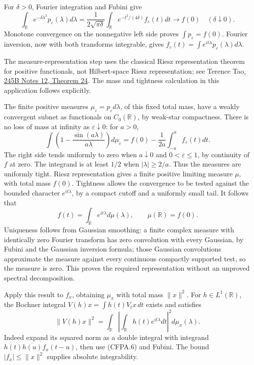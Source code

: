 For \(\delta>0\), Fourier integration and Fubini give \[
\int_{\mathbb R}e^{-\delta\lambda^2}p_\varepsilon(\lambda)d\lambda
=\frac1{2\sqrt{\pi\delta}}
\int_{\mathbb R}e^{-t^2/(4\delta)}f_\varepsilon(t)dt
\longrightarrow f(0)
\quad(\delta\downarrow0).
\tag{CFPA.4}
\] Monotone convergence on the nonnegative left side proves
\(\int p_\varepsilon=f(0)\). Fourier inversion, now with both transforms
integrable, gives
\(f_\varepsilon(t)=\int e^{it\lambda}p_\varepsilon(\lambda)d\lambda\).

The measure-representation step uses the classical Riesz representation theorem for positive functionals, not Hilbert-space Riesz representation; see Terence Tao, \href{https://terrytao.wordpress.com/2009/03/02/245b-notes-12-continuous-functions-on-locally-compact-hausdorff-spaces/}{245B Notes 12, Theorem 24}. The mass and tightness calculation in this application follows explicitly.

The finite positive measures \(\mu_\varepsilon=p_\varepsilon d\lambda\),
of this fixed total mass, have a weakly convergent subnet as functionals
on \(C_0(\mathbb R)\), by weak-star compactness. There is no loss of
mass at infinity as \(\varepsilon\downarrow0\): for \(a>0\), \[
\int\left(1-\frac{\sin(a\lambda)}{a\lambda}\right)d\mu_\varepsilon
=f(0)-\frac1{2a}\int_{-a}^a f_\varepsilon(t)dt.
\tag{CFPA.5}
\] The right side tends uniformly to zero when \(a\downarrow0\) and
\(0<\varepsilon\le1\), by continuity of \(f\) at zero. The integrand is
at least \(1/2\) when \(|\lambda|\ge2/a\). Thus the measures are
uniformly tight. Riesz representation gives a finite positive limiting
measure \(\mu\), with total mass \(f(0)\). Tightness allows the
convergence to be tested against the bounded character
\(e^{it\lambda}\), by a compact cutoff and a uniformly small tail. It
follows that \[
f(t)=\int_{\mathbb R}e^{it\lambda}d\mu(\lambda),
\qquad \mu(\mathbb R)=f(0).
\tag{CFPA.6}
\] Uniqueness follows from Gaussian smoothing: a finite complex measure
with identically zero Fourier transform has zero convolution with every
Gaussian, by Fubini and the Gaussian inversion formula; those Gaussian
convolutions approximate the measure against every continuous compactly
supported test, so the measure is zero. This proves the required
representation without an unproved spectral decomposition.

Apply this result to \(f_x\), obtaining \(\mu_x\) with total mass
\(\|x\|^2\). For \(h\in L^1(\mathbb R)\), the Bochner integral
\(V(h)x=\int h(t)V_tx\,dt\) exists and satisfies \[
\|V(h)x\|^2
=\int_{\mathbb R}\left|\int_{\mathbb R}h(t)e^{it\lambda}dt\right|^2d\mu_x(\lambda).
\tag{CFPA.7}
\] Indeed expand its squared norm as a double integral with integrand
\(h(t)\overline{h(u)}f_x(t-u)\), then use (CFPA.6) and Fubini. The bound
\(|f_x|\le\|x\|^2\) supplies absolute integrability.

